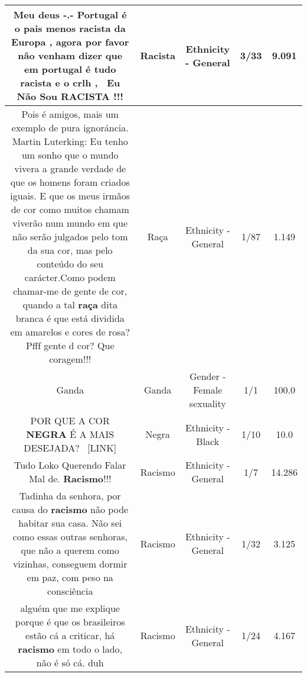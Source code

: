 \documentclass[11pt]{article}
\newlength\mylength
\begin{document}
\begin{center}
\begin{longtable}{|C{.65\mylength}|C{.30\mylength}|C{.12\mylength}|C{.12\mylength}|C{.12\mylength}|}
  \small Meu deus -.- Portugal é o pais menos \textbf{racista} da Europa , agora por favor não venham dizer que em portugal é tudo \textbf{racista} e o crlh ,  Eu Não Sou \textbf{RACISTA} !!!\normalsize   & Racista & Ethnicity - General & 3/33 & 9.091 \\  \hline
  \small Pois é amigos, mais um exemplo de pura ignoráncia. Martin Luterking: Eu tenho um sonho que o mundo vivera a grande verdade de que os homens foram criados iguais. E que os meus irmãos de cor como muitos chamam viverão num mundo em que não serão julgados pelo tom da sua cor, mas pelo conteúdo do seu carácter.Como podem chamar-me de gente de cor, quando a tal \textbf{raça} dita branca é que está dividida em amarelos e cores de rosa? Pfff gente d cor? Que coragem!!!\normalsize   & Raça & Ethnicity - General & 1/87 & 1.149 \\  \hline
  \small Ganda\normalsize   & Ganda & Gender - Female sexuality & 1/1 & 100.0 \\  \hline
  \small POR QUE A COR \textbf{NEGRA} É A MAIS DESEJADA?  [LINK] \normalsize   & Negra & Ethnicity - Black & 1/10 & 10.0 \\  \hline
  \small Tudo Loko Querendo Falar Mal de. \textbf{Racismo}!!!\normalsize   & Racismo & Ethnicity - General & 1/7 & 14.286 \\  \hline
  \small Tadinha da senhora, por causa do \textbf{racismo} não pode habitar sua casa. Não sei como essas outras senhoras, que não a querem como vizinhas, conseguem dormir em paz, com peso na consciência\normalsize   & Racismo & Ethnicity - General & 1/32 & 3.125 \\  \hline
  \small alguém que me explique porque é que os brasileiros estão cá a criticar, há \textbf{racismo} em todo o lado, não é só cá. duh\normalsize   & Racismo & Ethnicity - General & 1/24 & 4.167 \\  \hline

\end{longtable}
\end{center}
\end{document}
